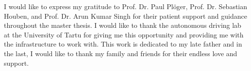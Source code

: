 




    \begin{acknowledgements}
      
        I would like to express my gratitude to Prof. Dr. Paul Pl\"oger, Prof. Dr. Sebastian Houben, and Prof. Dr. Arun Kumar Singh for their patient support and guidance throughout the master thesis. I would like to thank the autonomous driving lab at the University of Tartu for giving me this opportunity and providing me with the infrastructure to work with. This work is dedicated to my late father and in the last, I would like to thank my family and friends for their endless love and support. 
        
    \end{acknowledgements}

